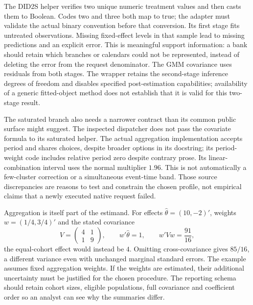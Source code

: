 The DID2S helper verifies two unique numeric treatment values and then casts
them to Boolean. Codes two and three both map to true; the adapter must
validate the actual binary convention before that conversion. Its first stage
fits untreated observations. Missing fixed-effect levels in that sample lead
to missing predictions and an explicit error. This is meaningful support
information: a bank should retain which branches or calendars could not be
represented, instead of deleting the error from the request denominator. The
GMM covariance uses residuals from both stages. The wrapper retains the
second-stage inference degrees of freedom and disables specified
post-estimation capabilities; availability of a generic fitted-object method
does not establish that it is valid for this two-stage result.
\citep{exec23_pyfixest_reuse_source}

The saturated branch also needs a narrower contract than its common public
surface might suggest. The inspected dispatcher does not pass the covariate
formula to its saturated helper. The actual aggregation implementation
accepts period and shares choices, despite broader options in its docstring;
its period-weight code includes relative period zero despite contrary prose.
Its linear-combination interval uses the normal multiplier $1.96$. This is
not automatically a few-cluster correction or a simultaneous event-time band.
Those source discrepancies are reasons to test and constrain the chosen
profile, not empirical claims that a newly executed native request failed.
\citep{exec23_pyfixest_reuse_source}

Aggregation is itself part of the estimand. For effects
$\widehat\theta=(10,-2)'$, weights $w=(1/4,3/4)'$ and the stated covariance
\begin{equation}
 V=\begin{pmatrix}4&1\\1&9\end{pmatrix},
 \qquad w'\widehat\theta=1,
 \qquad w'Vw=\frac{91}{16},
 \label{exec23:panel-aggregation}
\end{equation}
the equal-cohort effect would instead be $4$. Omitting cross-covariance gives
$85/16$, a different variance even with unchanged marginal standard errors.
The example assumes fixed aggregation weights. If the weights are estimated,
their additional uncertainty must be justified for the chosen procedure.
The reporting schema should retain cohort sizes, eligible populations, full
covariance and coefficient order so an analyst can see why the summaries
differ. \citep{exec23_pyfixest_reference}

